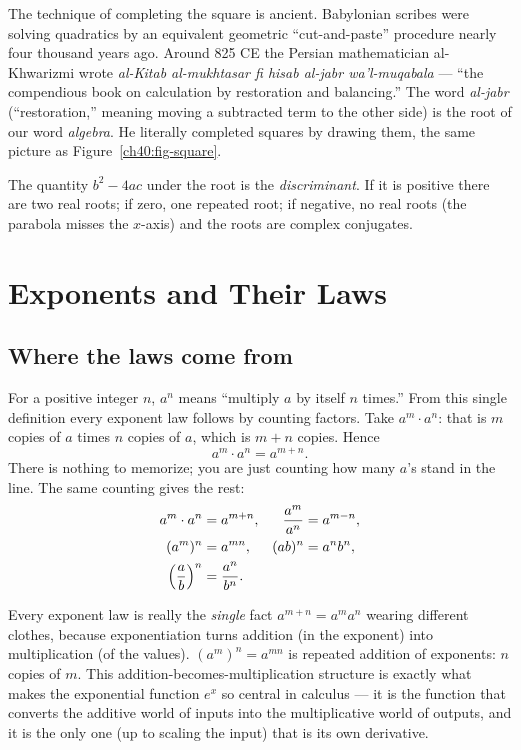 \begin{historybox}
The technique of completing the square is ancient. Babylonian scribes were solving
quadratics by an equivalent geometric ``cut-and-paste'' procedure nearly four
thousand years ago. Around 825 CE the Persian mathematician al-Khwarizmi wrote
\emph{al-Kitab al-mukhtasar fi hisab al-jabr wa'l-muqabala} --- ``the compendious
book on calculation by restoration and balancing.'' The word \emph{al-jabr}
(``restoration,'' meaning moving a subtracted term to the other side) is the root
of our word \emph{algebra}. He literally completed squares by drawing them, the
same picture as Figure~\ref{ch40:fig-square}.
\end{historybox}

The quantity $b^2 - 4ac$ under the root is the \emph{discriminant}. If it is
positive there are two real roots; if zero, one repeated root; if negative, no real
roots (the parabola misses the $x$-axis) and the roots are complex conjugates.

\section{Exponents and Their Laws}
\label{ch40:exponents}

\subsection{Where the laws come from}

For a positive integer $n$, $a^n$ means ``multiply $a$ by itself $n$ times.'' From
this single definition every exponent law follows by counting factors. Take
$a^m \cdot a^n$: that is $m$ copies of $a$ times $n$ copies of $a$, which is $m+n$
copies. Hence
\[
  a^m \cdot a^n = a^{m+n}.
\]
There is nothing to memorize; you are just counting how many $a$'s stand in the
line. The same counting gives the rest:
\begin{align}
  a^m \cdot a^n &= a^{m+n}, & \frac{a^m}{a^n} &= a^{m-n}, \\
  (a^m)^n &= a^{mn}, & (ab)^n &= a^n b^n, \\
  \Bigl(\frac{a}{b}\Bigr)^n &= \frac{a^n}{b^n}. & &
\end{align}

\begin{happeningbox}
Every exponent law is really the \emph{single} fact $a^{m+n}=a^m a^n$ wearing
different clothes, because exponentiation turns addition (in the exponent) into
multiplication (of the values). $(a^m)^n = a^{mn}$ is repeated addition of
exponents: $n$ copies of $m$. This addition-becomes-multiplication structure is
exactly what makes the exponential function $e^x$ so central in calculus --- it is
the function that converts the additive world of inputs into the multiplicative
world of outputs, and it is the only one (up to scaling the input) that is its own
derivative.
\end{happeningbox}

